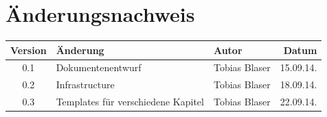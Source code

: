 \documentclass[ngerman,a4paper,12pt]{scrreprt}
\providecommand{\versionnumber}{0.3}
\begin{document}
%

%

\chapter*{Änderungsnachweis}
\begin{tabularx}{\textwidth}{|cXlr|} %
		\hline
		\textbf{Version} & \textbf{Änderung} & \textbf{Autor} & \textbf{Datum}\\
		\hline
		0.1 & Dokumentenentwurf & Tobias Blaser & 15.09.14.\\
		0.2 & Infrastructure & Tobias Blaser & 18.09.14.\\
		\versionnumber & Templates für verschiedene Kapitel & Tobias Blaser & 22.09.14.\\
		\hline
\end{tabularx}

\tableofcontents


%
%
%










%


%
%
%



\nocite{*}
{}

\listoffigures







%

%

%	
\end{document}

